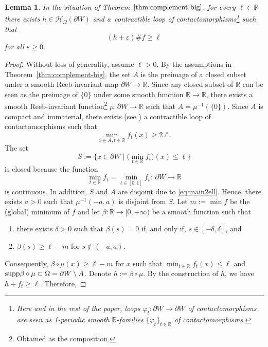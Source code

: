 \documentclass[10pt,a4paper]{amsart}
\numberwithin{equation}{section}
\newtheorem{Lemma}[Theorem]{Lemma}
\theoremstyle{definition}
\begin{document}
\begin{Lemma}\label{lem:twisttrick}
In the situation of Theorem~$\ref{thm:complement-big}$, for every $\ell\in\mathbb{R}$ there exists $h\in\mathcal{H}_{\Omega}(\partial W)$ and a~contractible loop  of contactomorphisms\footnote{Here and in the rest of the paper, loops $\varphi_t\colon \partial W\to\partial W$ of contactomorphisms are seen as 1-periodic smooth $\mathbb{R}$-families $\{\varphi_t\}_{t\in \mathbb{R}}$ of contactomorphisms.} such that
\[ (h+\varepsilon)\# f\geqslant \ell\]
for all $\varepsilon \geqslant 0$.
\end{Lemma}
\begin{proof}
Without loss of generality, assume $\ell>0$. By the assumptions in Theorem~\ref{thm:complement-big}, {the set $A$ is the preimage of a closed subset under a smooth Reeb-invariant map $\partial W\to\mathbb{R}$. Since any closed subset of $\mathbb{R}$ can be seen as the preimage of $\{0\}$ under some smooth function $\mathbb{R}\to\mathbb{R}$,} there exists a smooth Reeb-invariant function\footnote{{Obtained as the composition.}} $\mu\colon \partial W\to\mathbb{R}$ such that $A=\mu^{-1}(\{0\})$. Since $A$ is compact and immaterial, there exists (see \cite[Lemma~7.2]{uljarevic2023selective}) a contractible loop of contactomorphisms  such that
\begin{equation} \label{eq:main2ell}
\min_{x\in A, t\in\mathbb{R}} f_t(x)\geqslant 2\ell.
\end{equation}
The set
\[S:=\bigl\{ x\in\partial W\mid \bigl(\min_{t\in\mathbb{R}} f_t\bigr)(x)\leqslant \ell \bigr\}\]
is closed because the function
\[ \min_{t\in\mathbb{R}} f_t = \min_{t\in[0,1]} f_t \colon \ \partial W\to \mathbb{R} \]
is {continuous}. In addition, $S$ and $A$ are disjoint due to \eqref{eq:main2ell}. Hence, there exists $a>0$ such that $\mu^{-1}(-a, a)$ is disjoint from $S$. Let $m:=\min f$ be the (global) minimum of $f$ and let $\beta\colon \mathbb{R}\to[0,+\infty)$ be a smooth function such that
\begin{enumerate}\itemsep=0pt
\item[(1)] there exists $\delta>0$ such that $\beta(s)=0$ if, and only if, $s\in[-\delta, \delta]$, and
\item[(2)] $\beta(s)\geqslant \ell - m$ for $s\not\in (-a, a)$.
\end{enumerate}
Consequently, $\beta\circ \mu(x)\geqslant \ell-m$ for $x$ such that $\min_{t\in\mathbb{R}} f_t(x)\leqslant \ell$ and ${\rm supp} \beta\circ \mu \subset \Omega= \partial W\setminus A$. Denote $h:=\beta\circ\mu$. By the construction of $h$, we have $h+f_t\geqslant \ell$. Therefore,

\end{proof}
\end{document}
